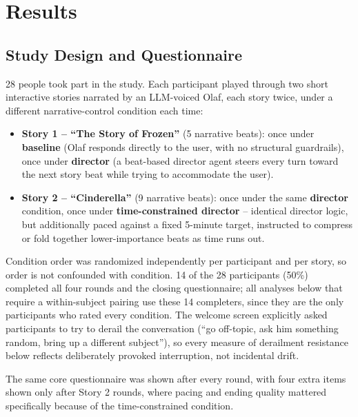 \documentclass[10pt]{article}
\begin{document}
\section{Results}
\label{sec:results}

\subsection{Study Design and Questionnaire}
\label{sec:design}

28 people took part in the study. Each participant played through two short interactive stories narrated by an LLM-voiced Olaf, each story twice, under a different narrative-control condition each time:

\begin{itemize}
\item \textbf{Story 1 -- ``The Story of Frozen''} (5 narrative beats): once under \textbf{baseline} (Olaf responds directly to the user, with no structural guardrails), once under \textbf{director} (a beat-based director agent steers every turn toward the next story beat while trying to accommodate the user).
\item \textbf{Story 2 -- ``Cinderella''} (9 narrative beats): once under the same \textbf{director} condition, once under \textbf{time-constrained director} -- identical director logic, but additionally paced against a fixed 5-minute target, instructed to compress or fold together lower-importance beats as time runs out.
\end{itemize}

Condition order was randomized independently per participant and per story, so order is not confounded with condition. 14 of the 28 participants (50\%) completed all four rounds and the closing questionnaire; all analyses below that require a within-subject pairing use these 14 completers, since they are the only participants who rated every condition. The welcome screen explicitly asked participants to try to derail the conversation (``go off-topic, ask him something random, bring up a different subject''), so every measure of derailment resistance below reflects deliberately provoked interruption, not incidental drift.

The same core questionnaire was shown after every round, with four extra items shown only after Story 2 rounds, where pacing and ending quality mattered specifically because of the time-constrained condition.
\end{document}

